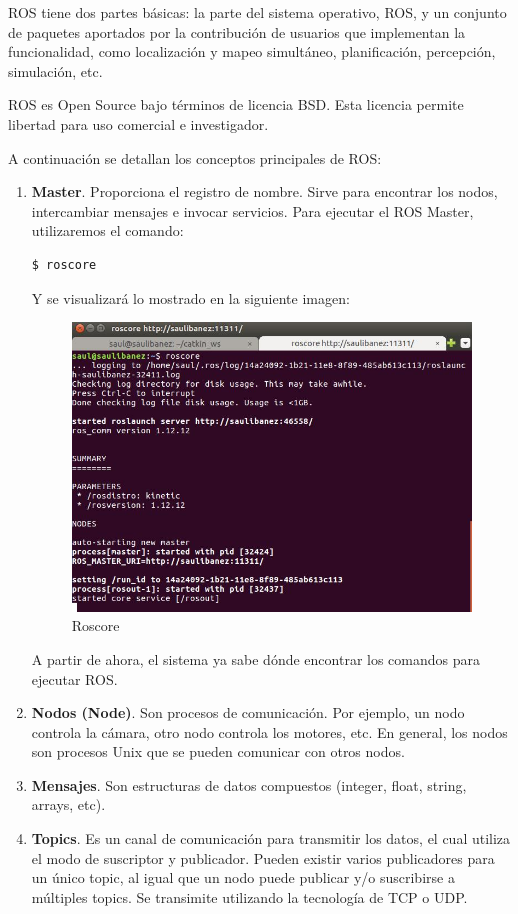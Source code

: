ROS tiene dos partes básicas: la parte del sistema operativo, ROS, y un conjunto de paquetes aportados por la contribución de usuarios que implementan la funcionalidad, como localización y mapeo simultáneo, planificación, percepción, simulación, etc.

ROS es Open Source bajo términos de licencia BSD. Esta licencia permite libertad para uso comercial e investigador.

A continuación se detallan los conceptos principales de ROS:
\begin{enumerate}
 \item \textbf{Master}. Proporciona el registro de nombre. Sirve para encontrar los nodos, intercambiar mensajes e invocar servicios. 
 Para ejecutar el ROS Master, utilizaremos el comando:
  \renewcommand{\lstlistingname}{}
  \begin{lstlisting}[caption=roscore, label={lst:roscore}]
    $ roscore
  \end{lstlisting}
    \newpage

  Y se visualizará lo mostrado en la siguiente imagen:
  
  \begin{figure} [hbtp]
  \begin{center}
    \includegraphics[width=12cm]{img/cap1/roscore}
  \end{center}
  \caption{Roscore}
  \label{fig:roscore}
  \end{figure}
  
  A partir de ahora, el sistema ya sabe dónde encontrar los comandos para ejecutar ROS.
  \item \textbf{Nodos (Node)}. Son procesos de comunicación. Por ejemplo, un nodo controla la cámara, otro nodo controla los motores, etc. En general, los nodos son procesos Unix que se pueden comunicar con otros nodos.
  \item \textbf{Mensajes}. Son estructuras de datos compuestos (integer, float, string, arrays, etc).
  \item \textbf{Topics}. Es un canal de comunicación para transmitir los datos, el cual utiliza el modo de suscriptor y publicador. Pueden existir varios publicadores para un único topic, al igual que un nodo puede publicar y/o suscribirse a múltiples topics.
  Se transimite utilizando la tecnología de TCP o UDP.
\end{enumerate}


